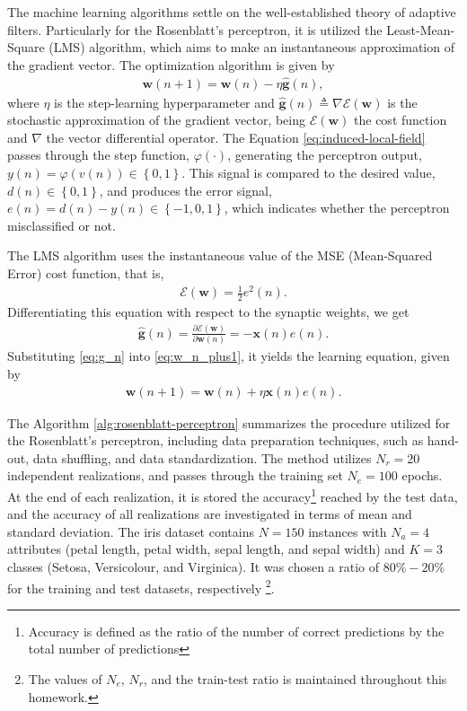 \documentclass[12pt,a4paper]{article}
\begin{document}
The machine learning algorithms settle on the well-established theory of adaptive filters. Particularly for the Rosenblatt's perceptron, it is utilized the Least-Mean-Square (LMS) algorithm, which aims to make an instantaneous approximation of the gradient vector. The optimization algorithm is given by
\begin{align}
    \mathbf{w}(n+1) = \mathbf{w}(n) - \eta \hat{\mathbf{g}}(n),
    \label{eq:w_n_plus1}
\end{align}
where \(\eta\) is the step-learning hyperparameter and \(\hat{\mathbf{g}}(n) \triangleq \nabla \mathscr{E} (\mathbf{w})\) is the stochastic approximation of the gradient vector, being \(\mathscr{E} (\mathbf{w})\) the cost function and \(\nabla\) the vector differential operator. The Equation \eqref{eq:induced-local-field} passes through the step function, \(\varphi \left( \cdot \right)\), generating the perceptron output, \(y\left( n \right) = \varphi(v\left( n \right)) \in \left\{ 0,1 \right\}\). This signal is compared to the desired value, \(d\left( n \right) \in \left\{ 0,1 \right\} \), and produces the error signal, \(e\left( n \right) = d\left( n \right) - y\left( n \right) \in \left\{ -1, 0, 1 \right\}\), which indicates whether the perceptron misclassified or not.

The LMS algorithm uses the instantaneous value of the MSE (Mean-Squared Error) cost function, that is,
\begin{align}
    \mathscr{E} (\mathbf{w}) = \frac{1}{2}e^2(n).
\end{align}
Differentiating this equation with respect to the synaptic weights, we get
\begin{align}
    \hat{\mathbf{g}}(n) = \frac{\partial\mathscr{E} (\mathbf{w})}{\partial \mathbf{w}(n)} = - \mathbf{x}(n) e(n).
    \label{eq:g_n}
\end{align}
Substituting \eqref{eq:g_n} into \eqref{eq:w_n_plus1}, it yields the learning equation, given by
\begin{align}
    \mathbf{w}(n+1) = \mathbf{w}(n) + \eta \mathbf{x}(n) e(n).
\end{align}

The Algorithm \ref{alg:rosenblatt-perceptron} summarizes the procedure utilized for the Rosenblatt's perceptron, including data preparation techniques, such as hand-out, data shuffling, and data standardization. The method utilizes \(N_r=20\) independent realizations, and passes through the training set \(N_e=100\) epochs. At the end of each realization, it is stored the accuracy\footnote{Accuracy is defined as the ratio of the number of correct predictions by the total number of predictions} reached by the test data, and the accuracy of all realizations are investigated in terms of mean and standard deviation. The iris dataset contains \(N=150\) instances with \(N_a=4\) attributes (petal length, petal width, sepal length, and sepal width) and \(K=3\) classes (Setosa, Versicolour, and Virginica). It was chosen a ratio of \(80\%-20\%\) for the training and test datasets, respectively \footnote{The values of \(N_e\), \(N_r\), and the train-test ratio is maintained throughout this homework.}.
\end{document}
